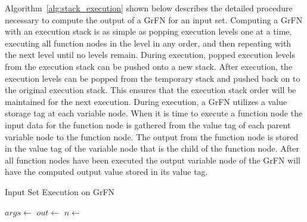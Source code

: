 Algorithm~\ref{alg:stack_execution} shown below describes the detailed procedure necessary to compute the output of a GrFN for an input set.
Computing a GrFN with an execution stack is as simple as popping execution levels one at a time, executing all function nodes in the level in any order, and then repeating with the next level until no levels remain.
During execution, popped execution levels from the execution stack can be pushed onto a new stack.
After execution, the execution levels can be popped from the temporary stack and pushed back on to the original execution stack.
This ensures that the execution stack order will be maintained for the next execution.
During execution, a GrFN utilizes a value storage tag at each variable node.
When it is time to execute a function node the input data for the function node is gathered from the value tag of each parent variable node to the function node.
The output from the function node is stored in the value tag of the variable node that is the child of the function node.
After all function nodes have been executed the output variable node of the GrFN will have the computed output value stored in its value tag.

\begin{algorithm}
  \caption{Input Set Execution on GrFN}
  \label{alg:stack_execution}
  \begin{algorithmic}[1]
     
      \State {} 
       
         
          \State $args \gets$ 
          \State $out \gets$ 
          \State $n \gets$  
          \State {}
        \EndFor
      \EndFor
      \State \Return {} 
    \EndProcedure
  \end{algorithmic}
\end{algorithm}


